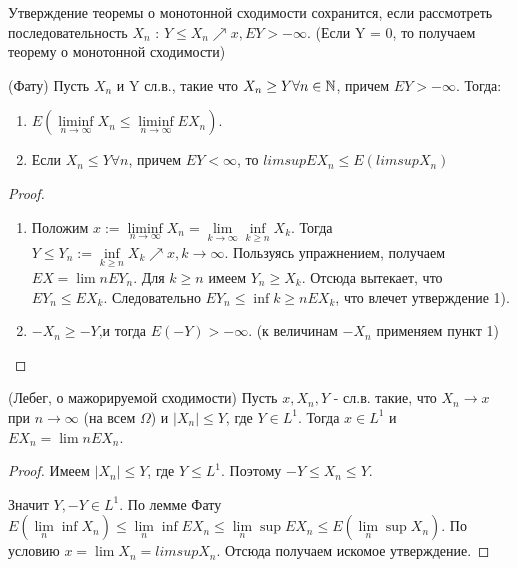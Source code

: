	\begin{lemma}\label{lect8:lemma2}
	 Утверждение теоремы о монотонной сходимости сохранится, если рассмотреть последовательность $X_n$ : $Y \le X_n \nearrow x, EY > -\infty$. (Если Y = 0, то получаем теорему о монотонной сходимости)	
	\end{lemma}
	
	\begin{lemma}\label{lect8:lemma3}
		(Фату) Пусть $X_n$ и Y сл.в., такие что $X_n \ge Y \forall n \in \mathbb{N}$, причем $EY > -\infty$. Тогда:
		\begin{enumerate}
	\item $E(\liminf\limits_{n \rightarrow \infty}X_n \le \liminf\limits_{n \rightarrow \infty} EX_n)$.
	\item Если $X_n \le Y \forall n$, причем $EY < \infty$, то $limsup EX_n \le E(limsup X_n)$
		\end{enumerate}	
		
	\end{lemma}
	\begin{proof}
		
		\begin{enumerate}
		\item Положим $x:= \liminf\limits_{n \rightarrow \infty}X_n = \lim\limits_{k \rightarrow \infty} \inf\limits_{k \ge n} X_k$.
		Тогда $Y \le Y_n := \inf\limits_{k \ge n} X_k \nearrow x, k \rightarrow \infty$. Пользуясь упражнением, получаем $EX = \lim\limits{n} EY_n$. Для $k \ge n$ имеем $Y_n \ge X_k$. Отсюда вытекает, что $EY_n \le EX_k$. Следовательно $EY_n \le \inf\limits{k \ge n}EX_k$, что влечет утверждение 1). 
		\item  $-X_n \ge -Y$,и тогда $E(-Y) > -\infty$. (к величинам $-X_n$ применяем пункт 1)
		\end{enumerate}
	\end{proof}	
	
	\begin{theorem}\label{lect8:th3}
	(Лебег, о мажорируемой сходимости)	Пусть $x, X_n, Y$ - сл.в. такие, что $X_n \rightarrow x$ при $n \rightarrow \infty$ (на всем $\Omega$) и $|X_n| \le Y$, где $Y \in L^1$. Тогда $x \in L^1$ и $EX_n = \lim\limits{n} EX_n$. 	
	\end{theorem}
	\begin{proof}
	Имеем $|X_n| \le Y$, где $Y \le L^1$. Поэтому $-Y \le X_n \le Y$.
	 
	 Значит $Y, -Y \in L^1$. По лемме Фату $E(\lim\limits_{n}\inf X_n) \le \lim\limits_{n}\inf EX_n \le \lim\limits_{n}\sup EX_n \le E(\lim\limits_{n}\sup X_n)$. По условию $x = \lim X_n = lim sup X_n$. Отсюда получаем искомое утверждение.	
	\end{proof}
	
